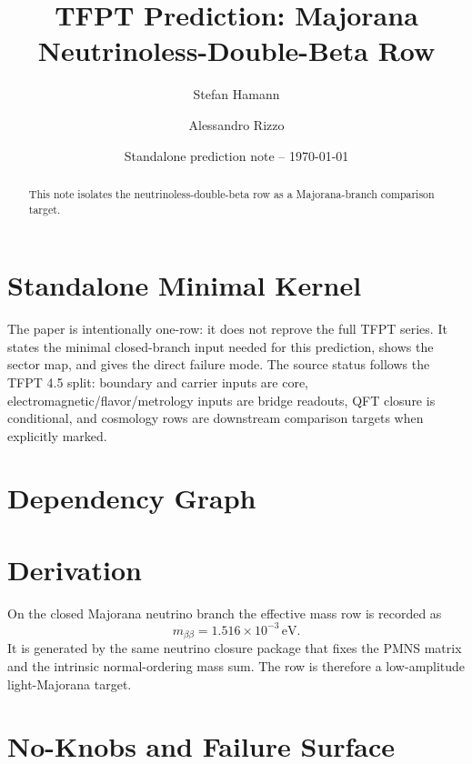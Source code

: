 \documentclass[11pt,a4paper]{article}
\title{\color{tfptblue}\textbf{TFPT Prediction: Majorana Neutrinoless-Double-Beta Row}}
\author{Stefan Hamann \and Alessandro Rizzo}
\date{{\normalsize\color{tfptgray}\sffamily Standalone prediction note -- \today}}
\begin{document}
\maketitle

\begin{abstract}
This note isolates the neutrinoless-double-beta row as a Majorana-branch comparison target.
\end{abstract}



\section{Standalone Minimal Kernel}
\MinimalKernelBox

The paper is intentionally one-row: it does not reprove the full TFPT series. It states the minimal closed-branch input needed for this prediction, shows the sector map, and gives the direct failure mode. The source status follows the TFPT 4.5 split: boundary and carrier inputs are core, electromagnetic/flavor/metrology inputs are bridge readouts, QFT closure is conditional, and cosmology rows are downstream comparison targets when explicitly marked.


\section{Dependency Graph}

\section{Derivation}

On the closed Majorana neutrino branch the effective mass row is recorded as
\[
m_{\beta\beta}=1.516\times10^{-3}\,\mathrm{eV}.
\]
It is generated by the same neutrino closure package that fixes the PMNS matrix and the intrinsic normal-ordering mass sum. The row is therefore a low-amplitude light-Majorana target.


\section{No-Knobs and Failure Surface}
\end{document}
